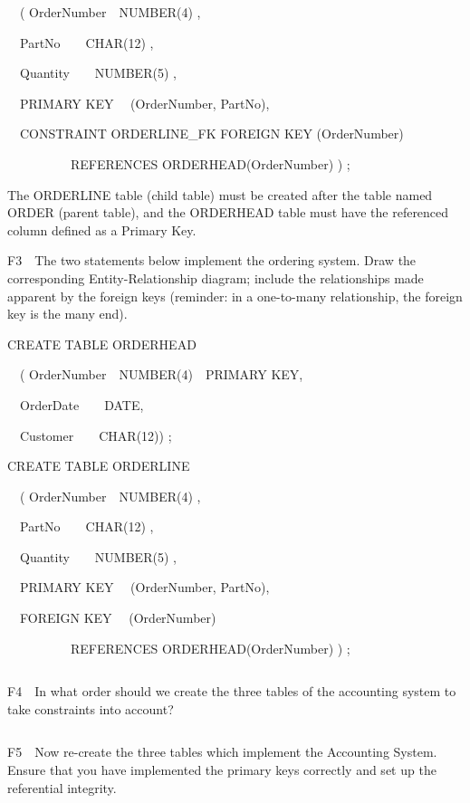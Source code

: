 \ \ ( OrderNumber\ \ NUMBER(4) ,

\ \   PartNo\ \ \ \ CHAR(12) ,

\ \   Quantity\ \ \ \ NUMBER(5) ,

\ \   PRIMARY KEY \ \ (OrderNumber, PartNo),

\ \   CONSTRAINT ORDERLINE\_FK FOREIGN KEY (OrderNumber) 

\ \ \ \ \ \ \ \ \ \ REFERENCES ORDERHEAD(OrderNumber) ) ;

The ORDERLINE table (child table) must be created after the table named ORDER (parent table), and the ORDERHEAD table must have the referenced column defined as a Primary Key.

F3\ \ The two statements below implement the ordering system. Draw the corresponding Entity-Relationship diagram; include the relationships made apparent by the foreign keys (reminder: in a one-to-many relationship, the foreign key is the many end).

CREATE TABLE ORDERHEAD

\ \ ( OrderNumber\ \ NUMBER(4)\ \ PRIMARY KEY,

\ \   OrderDate\ \ \ \ DATE,

\ \   Customer\ \ \ \ CHAR(12)) ;

 CREATE TABLE ORDERLINE

\ \ ( OrderNumber\ \ NUMBER(4) ,

\ \   PartNo\ \ \ \ CHAR(12) ,

\ \   Quantity\ \ \ \ NUMBER(5) ,

\ \   PRIMARY KEY \ \ (OrderNumber, PartNo),

\ \   FOREIGN KEY \ \ (OrderNumber) 

\ \ \ \ \ \ \ \ \ \ REFERENCES ORDERHEAD(OrderNumber) ) ;

\begin{flushleft}
\tablefirsthead{}
\tablehead{}
\tabletail{}
\tablelasttail{}
\begin{supertabular}{|m{15.663cm}|}
\hline
\\\hline
\end{supertabular}
\end{flushleft}
F4\ \ In what order should we create the three tables of the accounting system to take constraints into account?

\begin{flushleft}
\tablefirsthead{}
\tablehead{}
\tabletail{}
\tablelasttail{}
\begin{supertabular}{|m{14.663cm}|}
\hline
\\\hline
\end{supertabular}
\end{flushleft}
F5\ \ Now re-create the three tables which implement the Accounting System.  Ensure that you have implemented the primary keys correctly and set up the referential integrity.

